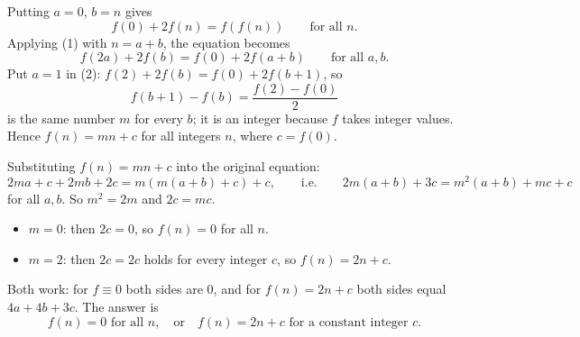 Putting $a=0$, $b=n$ gives
\[f(0)+2f(n)=f(f(n))\qquad\text{for all }n.\tag{1}\]
Applying (1) with $n=a+b$, the equation becomes
\[f(2a)+2f(b)=f(0)+2f(a+b)\qquad\text{for all }a,b.\tag{2}\]
Put $a=1$ in (2): $f(2)+2f(b)=f(0)+2f(b+1)$, so
\[f(b+1)-f(b)=\dfrac{f(2)-f(0)}{2}\]
is the same number $m$ for every $b$; it is an integer because $f$ takes integer values. Hence $f(n)=mn+c$ for all integers $n$, where $c=f(0)$.

Substituting $f(n)=mn+c$ into the original equation:
\[2ma+c+2mb+2c=m\left(m(a+b)+c\right)+c,\qquad\text{i.e.}\qquad2m(a+b)+3c=m^2(a+b)+mc+c\]
for all $a,b$. So $m^2=2m$ and $2c=mc$.
\begin{itemize}
\item $m=0$: then $2c=0$, so $f(n)=0$ for all $n$.
\item $m=2$: then $2c=2c$ holds for every integer $c$, so $f(n)=2n+c$.
\end{itemize}
Both work: for $f\equiv0$ both sides are $0$, and for $f(n)=2n+c$ both sides equal $4a+4b+3c$. The answer is
\[\boxed{f(n)=0\text{ for all }n,\quad\text{or}\quad f(n)=2n+c\text{ for a constant integer }c}.\]
